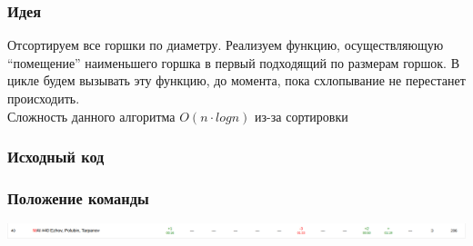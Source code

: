 \documentclass[12pt]{article}
\begin{document}
\subsubsection*{Идея}
Отсортируем все горшки по диаметру. Реализуем функцию, осуществляющую “помещение” наименьшего горшка в первый подходящий по размерам горшок. 
В цикле будем вызывать эту функцию, до момента, пока схлопывание не перестанет происходить.
\\ 
Сложность данного алгоритма $O(n \cdot log{n})$ из-за сортировки
\subsubsection*{Исходный код}

\subsubsection*{Положение команды}
\includegraphics[scale=0.5]{images/6.png}\newline\noindent


\pagebreak
\end{document}
